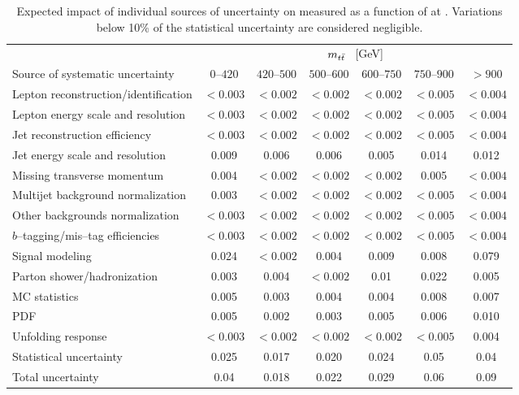 \begin{table}[!htbp]\centering
\begin{tabular}{l c c c c c c}
\toprule
 &\multicolumn{6}{c}{$m_{t\bar{t}}{}$ ~[GeV]} \\
Source of systematic uncertainty&$0$--$420$&$420$--$500$&$500$--$600$&$600$--$750$&$750$--$900$&$>900$ \\
\midrule
Lepton reconstruction/identification & $<0.003$ & $<0.002$ & $<0.002$ & $<0.002$ & $<0.005$ & $<0.004$\\
Lepton energy scale and resolution & $<0.003$ & $<0.002$ & $<0.002$ & $<0.002$ & $<0.005$ & $<0.004$ \\
Jet reconstruction efficiency & $<0.003$ & $<0.002$ & $<0.002$ & $<0.002$ & $<0.005$ & $<0.004$  \\
Jet energy scale and resolution & 0.009 & 0.006 & 0.006 & 0.005 & 0.014 & 0.012 \\
Missing transverse momentum & 0.004 & $<0.002$ & $<0.002$ & $<0.002$ & 0.005 & $<0.004$  \\
Multijet background normalization & 0.003 & $<0.002$ & $<0.002$ & $<0.002$ & $<0.005$ & $<0.004$  \\
Other backgrounds normalization & $<0.003$ & $<0.002$ & $<0.002$ & $<0.002$ & $<0.005$ & $<0.004$  \\
$b$--tagging/mis--tag efficiencies & $<0.003$ & $<0.002$ & $<0.002$ & $<0.002$ & $<0.005$ & $<0.004$  \\
Signal modeling & 0.024 & $<0.002$ & 0.004 & 0.009 & 0.008  & 0.079 \\
Parton shower/hadronization & 0.003 & 0.004 & $<0.002$ & 0.01 & 0.022 &0.005 \\
MC statistics & 0.005 & 0.003 & 0.004 & 0.004 & 0.008 & 0.007\\
PDF & 0.005 &0.002 & 0.003 & 0.005 & 0.006 & 0.010\\
Unfolding response & $<0.003$  & $<0.002$ & $<0.002$  & $<0.002$ & $<0.005$  & 0.004\\
\midrule
Statistical uncertainty & 0.025 & 0.017 & 0.020 & 0.024 & 0.05 & 0.04\\
\midrule
Total uncertainty  & 0.04 & 0.018 & 0.022 & 0.029 & 0.06 & 0.09\\
\bottomrule
\end{tabular}
\caption{Expected impact of individual sources of uncertainty on 
  \ac{} measured as a function of \mtt{} at \seventev{}. Variations below 10\%
  of the statistical uncertainty are considered negligible.}
\label{table:Systematics_mtt8tev}
\end{table}

